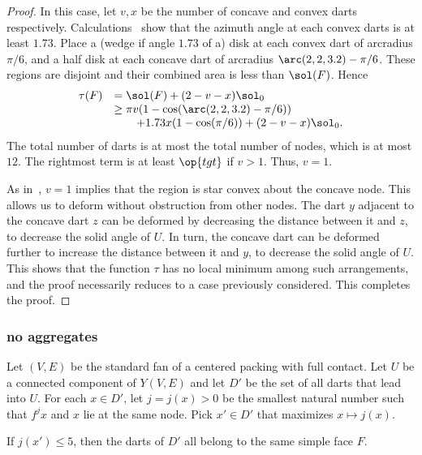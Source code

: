 \begin{proof}
 In this case,
let $v,x$ be the number of concave and convex darts respectively.
Calculations~\cite[cc:lft]{hales:2009:nonlinear} show that the azimuth
angle at each convex darts is at least $1.73$.  Place a (wedge if
angle $1.73$ of a) disk at each convex dart of arcradius $\pi/6$, and
a half disk at each concave dart of arcradius $\arc(2,2,3.2)-\pi/6$.
These regions are disjoint and their combined area is less than
$\sol(F)$.  Hence
\begin{displaymath}
\begin{array}{lll}
\tau(F)&=\sol(F)+(2-v-x)\sol_0 \\
&\ge \pi v (1-\cos(\arc(2,2,3.2)-\pi/6)) \\
&\qquad+ 1.73 x (1-\cos(\pi/6)) + (2-v-x)\sol_0.
\end{array}
\end{displaymath}
The total number of darts is at most the total number of nodes, which
is at most $12$.  The rightmost term is at least $\op{tgt}$ if $v>
1$. Thus, $v=1$.  %
%

As in~\cite{Hales:2006:DCG}, $v=1$ implies that the region is star
convex about the concave node.  This allows us to deform without
obstruction from other nodes.  The dart $y$ adjacent to the concave
dart $z$ can be deformed by decreasing the distance between it and
$z$, to decrease the solid angle of $U$.  In turn, the concave dart
can be deformed further to increase the distance between it and $y$,
to decrease the solid angle of $U$.  This shows that the function
$\tau$ has no local minimum among such arrangements, and the proof
necessarily reduces to a case previously considered.  This completes
the proof.
\end{proof}
%
%

\subsubsection{no aggregates}

Let $(V,E)$ be the standard fan of a centered packing with full
contact.  Let $U$ be a connected component of $Y(V,E)$ and let $D'$ be
the set of all darts that lead into $U$.  For each $x\in D'$, let $j =
j(x) >0$ be the smallest natural number such that $f^j x$ and $x$ lie
at the same node.  Pick $x'\in D'$ that maximizes $x\mapsto j(x)$.
%
%

\begin{lemma}\label{lemma:DU} If $j(x')\le 5$, then the
  darts of $D'$ all belong to the same simple face $F$.
\end{lemma}
%

